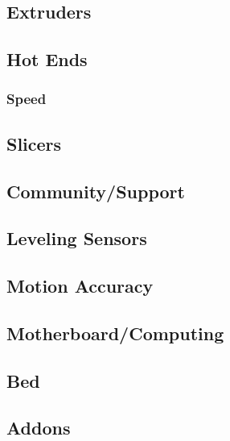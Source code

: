 \documentclass[11pt]{article}
\begin{document}
\subsection{Extruders}
\label{sec:orge2efea3}

\subsection{Hot Ends}
\label{sec:org62928b7}

\subsubsection{Speed}
\label{sec:org13c13c9}

\subsection{Slicers}
\label{sec:orgf7fe5ce}

\subsection{Community/Support}
\label{sec:orgdf4dcc2}

\subsection{Leveling Sensors}
\label{sec:org161e788}

\subsection{Motion Accuracy}
\label{sec:orgccc8fb4}

\subsection{Motherboard/Computing}
\label{sec:orgac364bc}

\subsection{Bed}
\label{sec:org33223ec}

\subsection{Addons}
\label{sec:org153b1ad}
\end{document}
